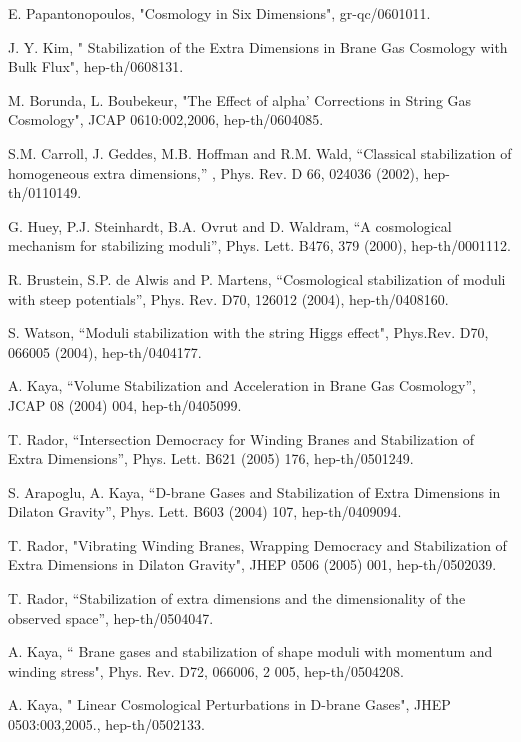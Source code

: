 \documentclass[aps,floatfix,twocolumn,amsmath]{revtex4}
\begin{document}
\begin{thebibliography}{100}
  E. Papantonopoulos, "Cosmology in Six Dimensions", gr-qc/0601011.

   J. Y. Kim, " Stabilization of the Extra Dimensions in Brane Gas Cosmology with Bulk Flux", hep-th/0608131.

  M. Borunda, L. Boubekeur, "The Effect of alpha' Corrections in String Gas Cosmology", JCAP 0610:002,2006,  hep-th/0604085.

 S.M. Carroll, J. Geddes, M.B. Hoffman and R.M. Wald, ``Classical stabilization of homogeneous extra dimensions,''
, Phys. Rev. D 66, 024036 (2002), hep-th/0110149.

 G. Huey, P.J. Steinhardt, B.A. Ovrut and D. Waldram, ``A cosmological mechanism for stabilizing moduli'', Phys. Lett. B476, 379 (2000), hep-th/0001112.

  R. Brustein, S.P. de Alwis and P. Martens, ``Cosmological stabilization of moduli with steep potentials'',  Phys. Rev. D70, 126012 (2004), hep-th/0408160.

 S. Watson, ``Moduli stabilization with the string Higgs effect", Phys.Rev. D70, 066005 (2004), hep-th/0404177.


 A. Kaya, ``Volume Stabilization and Acceleration in
  Brane Gas Cosmology'', JCAP 08 (2004) 004, hep-th/0405099.

 T. Rador, ``Intersection Democracy for Winding Branes
and Stabilization of Extra Dimensions'', Phys. Lett. B621 (2005) 176, hep-th/0501249.

 S. Arapoglu, A. Kaya, ``D-brane Gases and Stabilization
 of Extra Dimensions in Dilaton Gravity'',  Phys. Lett. B603 (2004)
 107, hep-th/0409094.



 T. Rador, "Vibrating Winding Branes, Wrapping Democracy
  and Stabilization of Extra Dimensions in Dilaton Gravity",
  JHEP 0506 (2005) 001, hep-th/0502039.

 T. Rador, ``Stabilization of extra dimensions and the
  dimensionality of the observed space'', hep-th/0504047.

 A. Kaya, `` Brane gases and stabilization of shape moduli with momentum and winding stress",  Phys. Rev. D72, 066006, 2
005, hep-th/0504208.

  A. Kaya, " Linear Cosmological Perturbations in D-brane Gases", JHEP 0503:003,2005., hep-th/0502133. 


\end{thebibliography}
\end{document}

